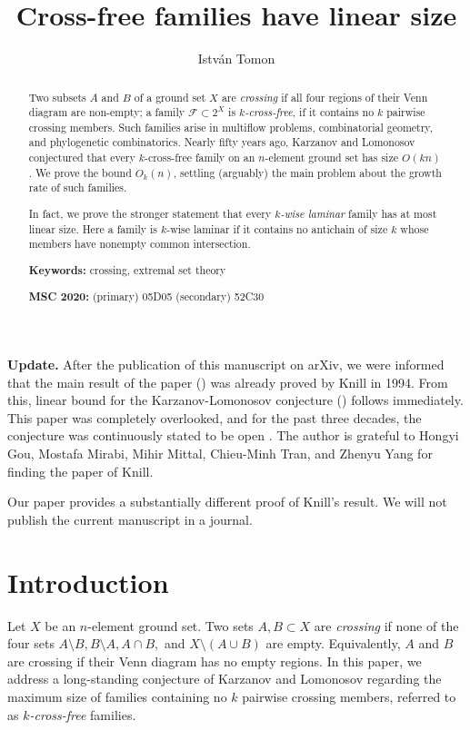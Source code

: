 \documentclass[11pt]{article}
\title{Cross-free families have linear size}
\author{Istv\'an Tomon}
\affil{Ume\r{a} University}
\affil{\texttt{istvan.tomon@umu.se}}
\date{}
\theoremstyle{definition}
\newcommand{\cF}{\mathcal{F}}
\begin{document}
\maketitle
\sloppy

\begin{abstract}
    Two subsets $A$ and $B$ of a ground set $X$ are \emph{crossing} if all four regions of their Venn diagram are non-empty; a family $\cF\subset 2^X$ is \emph{$k$-cross-free}, if it contains no $k$ pairwise crossing members. Such families arise in multiflow problems, combinatorial geometry, and phylogenetic combinatorics. Nearly fifty years ago, Karzanov and Lomonosov conjectured that every $k$-cross-free family on an $n$-element ground set has size $O(kn)$. We prove the bound $O_k(n)$, settling (arguably) the main problem about the growth rate of such families. 
    
    In fact, we prove the stronger statement that every \emph{$k$-wise laminar} family has at most linear size. Here a family is \(k\)-wise laminar if it contains no antichain of size \(k\) whose members have nonempty common intersection.

    \smallskip
\noindent \textbf{Keywords:} crossing, extremal set theory

\noindent \textbf{MSC 2020:} (primary) 05D05 (secondary) 52C30
\end{abstract}

\noindent
\textbf{Update.} After the publication of this manuscript on arXiv, we were informed  that the main result of the paper () was already proved by Knill \cite{Knill} in 1994. From this, linear bound for the Karzanov-Lomonosov conjecture () follows immediately. This paper was completely overlooked, and for the past three decades, the conjecture was continuously stated to be open \cite{DKM,Fleiner,GKMW,KPT}. The author is grateful to Hongyi Gou, Mostafa Mirabi, Mihir Mittal, Chieu-Minh Tran, and Zhenyu Yang for finding the paper of Knill.

Our paper provides a substantially different proof of Knill's result. We will not publish  the current manuscript in a journal.

\section{Introduction}

Let $X$ be an $n$-element ground set. Two sets $A,B\subset X$ are \emph{crossing} if none of the four sets $A\setminus B, B\setminus A, A\cap B,$ and $X\setminus(A\cup B)$ are empty. Equivalently, $A$ and $B$ are crossing if their Venn diagram has no empty regions. In this paper, we address a long-standing conjecture of Karzanov and Lomonosov \cite{KL} regarding the maximum size of families containing no $k$ pairwise crossing members, referred to as \emph{$k$-cross-free} families.
\end{document}

